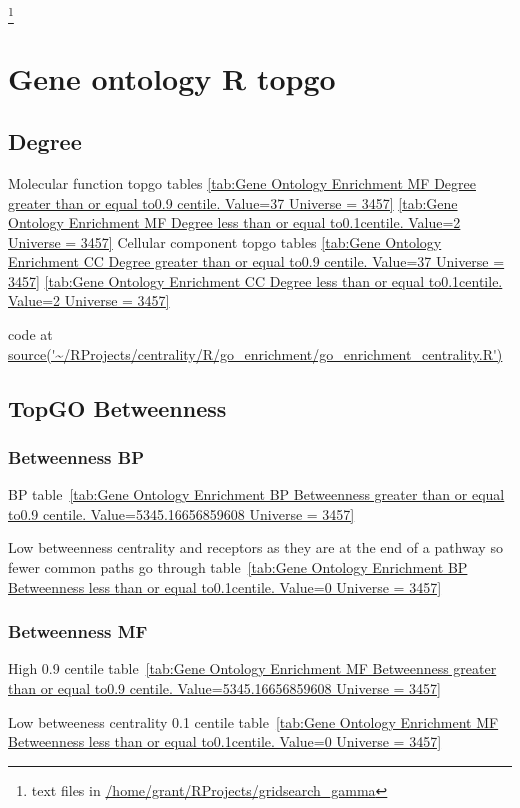 \footnote{text files in \url{/home/grant/RProjects/gridsearch_gamma}}

\section{Gene ontology R topgo}
\label{sec:Gene ontology topgo}
\cite{alexa2009gene}
\subsection{Degree}
Molecular function topgo tables
\ref{tab:Gene Ontology Enrichment MF Degree  greater than or equal to0.9 centile.   Value=37 Universe = 3457}
\ref{tab:Gene Ontology Enrichment MF Degree  less than or equal to0.1centile.   Value=2 Universe = 3457}
Cellular component topgo tables
 \ref{tab:Gene Ontology Enrichment CC Degree  greater than or equal to0.9 centile.   Value=37 Universe = 3457}
    \ref{tab:Gene Ontology Enrichment CC Degree  less than or equal to0.1centile.   Value=2 Universe = 3457}

code at \url{source('~/RProjects/centrality/R/go_enrichment/go_enrichment_centrality.R')}

\subsection{TopGO Betweenness}
\subsubsection{Betweenness BP}
BP table~\ref{tab:Gene Ontology Enrichment BP Betweenness  greater than or equal to0.9 centile.   Value=5345.16656859608 Universe = 3457}




Low betweenness centrality and receptors as they are at the end of a pathway so fewer common paths go through table~\ref{tab:Gene Ontology Enrichment BP Betweenness  less than or equal to0.1centile.   Value=0 Universe = 3457}
\subsubsection{Betweenness MF}
High 0.9 centile table~\ref{tab:Gene Ontology Enrichment MF Betweenness  greater than or equal to0.9 centile.   Value=5345.16656859608 Universe = 3457}

Low betweeness centrality 0.1 centile table~\ref{tab:Gene Ontology Enrichment MF Betweenness  less than or equal to0.1centile.   Value=0 Universe = 3457}



